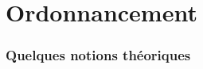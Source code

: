 %                                                                                                                       
%
%


\part{Ordonnancement}




\section{Quelques notions théoriques}

